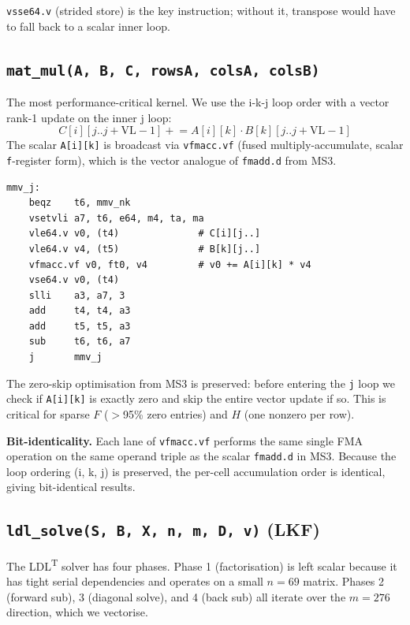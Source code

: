 \documentclass[11pt,a4paper]{article}
\begin{document}
\texttt{vsse64.v} (strided store) is the key instruction; without it,
transpose would have to fall back to a scalar inner loop.

\subsection{\texttt{mat\_mul(A, B, C, rowsA, colsA, colsB)}}

The most performance-critical kernel. We use the i-k-j loop order with a
vector rank-1 update on the inner j loop:
\[
C[i][j..j+\mathrm{VL}-1] \mathrel{+}= A[i][k] \cdot B[k][j..j+\mathrm{VL}-1]
\]
The scalar \texttt{A[i][k]} is broadcast via \texttt{vfmacc.vf} (fused
multiply-accumulate, scalar \texttt{f}-register form), which is the
vector analogue of \texttt{fmadd.d} from MS3.

\begin{lstlisting}[caption={Vectorised mat\_mul inner-j loop with vfmacc.vf}]
mmv_j:
    beqz    t6, mmv_nk
    vsetvli a7, t6, e64, m4, ta, ma
    vle64.v v0, (t4)              # C[i][j..]
    vle64.v v4, (t5)              # B[k][j..]
    vfmacc.vf v0, ft0, v4         # v0 += A[i][k] * v4
    vse64.v v0, (t4)
    slli    a3, a7, 3
    add     t4, t4, a3
    add     t5, t5, a3
    sub     t6, t6, a7
    j       mmv_j
\end{lstlisting}

The zero-skip optimisation from MS3 is preserved: before entering the
\texttt{j} loop we check if \texttt{A[i][k]} is exactly zero and skip the
entire vector update if so. This is critical for sparse $F$ ($>$95\% zero
entries) and $H$ (one nonzero per row).

\textbf{Bit-identicality.} Each lane of \texttt{vfmacc.vf} performs the same
single FMA operation on the same operand triple as the scalar
\texttt{fmadd.d} in MS3. Because the loop ordering (i, k, j) is preserved,
the per-cell accumulation order is identical, giving bit-identical results.

\subsection{\texttt{ldl\_solve(S, B, X, n, m, D, v)} (LKF)}

The LDL\textsuperscript{T} solver has four phases. Phase 1 (factorisation)
is left scalar because it has tight serial dependencies and operates on a
small $n=69$ matrix. Phases 2 (forward sub), 3 (diagonal solve), and 4
(back sub) all iterate over the $m=276$ direction, which we vectorise.
\end{document}
